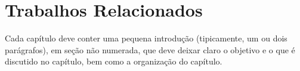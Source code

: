 
\chapter{Trabalhos Relacionados}
\label{chap:trabRelac}

Cada capítulo deve conter uma pequena introdução (tipicamente, um ou dois parágrafos), em seção não numerada, que deve deixar claro o objetivo e o que é discutido no capítulo, bem como a organização do capítulo.
